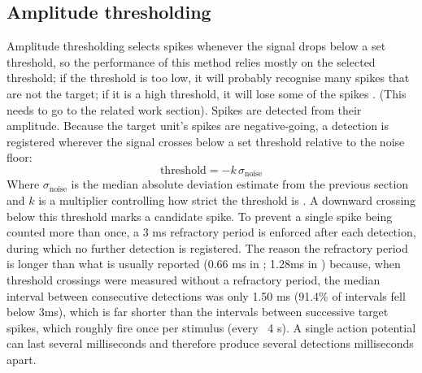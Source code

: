 \documentclass[ %
                    author={Daniel Page},
                supervisor={Dr. Andrew Calway},
                    degree={MSc},
                     title={Some Structural Guidelines for Data Science MSc Theses, Including Those With Long Titles that Run Across Multiple Lines on the Front Page},
                  subtitle={And those including an optional subtitle too, for good measure},
                      type={},
                      year={2021}]{dissertation}
\begin{document}
\subsection{Amplitude thresholding}
Amplitude thresholding selects spikes whenever the signal drops below a set threshold, so the performance of this method relies mostly on the selected threshold; if the threshold is too low, it will probably recognise many spikes that are not the target; if it is a high threshold, it will lose some of the spikes \cite{cimolato_modern_2021}. (This needs to go to the related work section). 
Spikes are detected from their amplitude. Because the target unit's spikes are negative-going, a detection is registered wherever the signal crosses below a set threshold relative to the noise floor: 
\begin{equation}
    \text{threshold} = -k\,\sigma_{\text{noise}}
    \label{MAD noise estimate}
\end{equation}
Where \(\sigma_{\text{noise}}\) is the median absolute deviation estimate from the previous section and \(k\) is a multiplier controlling how strict the threshold is \cite{quiroga_unsupervised_2004, park_deep_2019}. A downward crossing below this threshold marks a candidate spike. 
To prevent a single spike being counted more than once, a 3 ms refractory period is enforced after each detection, during which no further detection is registered. The reason the refractory period is longer than what is usually reported (0.66 ms in \cite{laboy-juarez_normalized_2019}; 1.28ms in \cite{rizk_optimizing_2009}) because, when threshold crossings were measured without a refractory period, the median interval between consecutive detections was only 1.50 ms  (91.4\% of intervals fell below 3ms), which is far shorter than the intervals between successive target spikes, which roughly fire once per stimulus (every ~4 s). A single action potential can last several milliseconds and therefore produce several detections milliseconds apart. 
\end{document}
